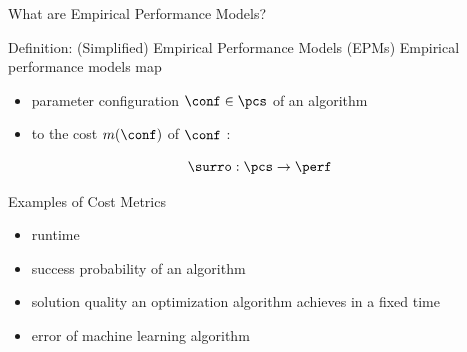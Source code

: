 {
\begin{frame}[c]{What are Empirical Performance Models?}

\begin{block}{Definition: (Simplified) Empirical Performance Models (EPMs)}
Empirical performance models map
\begin{itemize} 
  \item parameter configuration $\conf \in \pcs$ of an algorithm 
  \item to the cost $m(\conf)$ of $\conf$ : 
\end{itemize}


\begin{equation}
\surro: \pcs \to \perf \nonumber
\end{equation}
\end{block}

\pause

\begin{block}{Examples of Cost Metrics}
\begin{itemize}
  \item runtime
  \item success probability of an algorithm
  \item solution quality an optimization algorithm achieves in a fixed time
  \item error of machine learning algorithm
\end{itemize}
\end{block}

\end{frame}}
